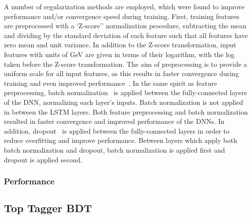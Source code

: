 A number of regularization methods are employed, which were found to improve performance and/or convergence speed during training.
First, training features are preprocessed with a `Z-score'' normalization procedure, subtracting the mean and dividing by the standard deviation of each feature such that all features have zero mean and unit variance.
In addition to the Z-score transformation, input features with units of GeV are given in terms of their logarithm, with the log taken before the Z-score transformation.
The aim of preprocessing is to provide a uniform scale for all input features, as this results in faster convergence during training and even improved performance~\cite{lecun_efficient_backprop}.
In the same spirit as feature preprocessing, batch normalization~\cite{ioffe2015batch} is applied between the fully-connected layers of the DNN, normalizing each layer's inputs.
Batch normalization is not applied in between the LSTM layers.
Both feature preprocessing and batch normalization resulted in faster convergence and improved performance of the DNNs.
In addition, dropout~\cite{dropout} is applied between the fully-connected layers in order to reduce overfitting and improve performance.
Between layers which apply both batch normalization and dropout, batch normalization is applied first and dropout is applied second.

\subsubsection{Performance}

\subsection{Top Tagger BDT} \label{sec:tth_top_tagger_bdt}

